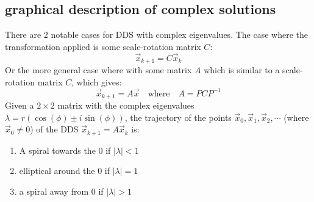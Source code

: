 \documentclass[11pt, a4paper]{article}
\begin{document}
\subsection{graphical description of complex solutions}
There are 2 notable cases for DDS with complex eigenvalues. The case where the transformation applied is some scale-rotation matrix $C$:
\begin{equation}
  \vec{x}_{k+1} = C\vec{x}_k
\end{equation}
Or the more general case where with some matrix $A$ which is similar to a scale-rotation matrix $C$, which gives:
\begin{equation}
  \vec{x}_{k+1} = A \vec{x} \quad \text{where} \quad A=PCP^{-1}
\end{equation}
Given a $2 \times 2$ matrix with the complex eigenvalues $\lambda = r(\cos(\phi) \pm i\sin(\phi))$, the trajectory of the points $\vec{x}_0, \vec{x}_1, \vec{x}_2, \cdots$ (where $\vec{x}_0 \neq 0$) of the DDS $\vec{x}_{k+1} = A\vec{x}_k$ is:
\begin{enumerate}[label=\alph*]
  \item A spiral towards the $0$ if $|\lambda| < 1$
  \item elliptical around the $0$ if $|\lambda| = 1$
  \item a spiral away from $0$  if $|\lambda| > 1$
\end{enumerate}
\end{document}
